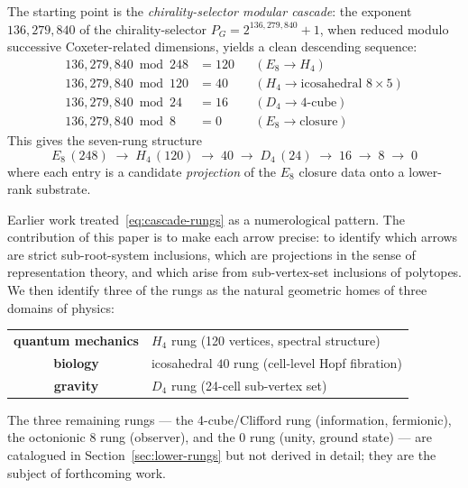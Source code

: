\documentclass[12pt]{article}
\begin{document}
The starting point is the \emph{chirality-selector modular cascade}: the exponent $136{,}279{,}840$ of the chirality-selector $P_G = 2^{136{,}279{,}840}+1$, when reduced modulo successive Coxeter-related dimensions, yields a clean descending sequence:
\begin{equation}\label{eq:cascade-residues}
\begin{aligned}
136{,}279{,}840 \bmod 248 &= 120 && (E_8 \to H_4) \\
136{,}279{,}840 \bmod 120 &= 40  && (H_4 \to \text{icosahedral 8}\times 5) \\
136{,}279{,}840 \bmod 24  &= 16  && (D_4 \to \text{4-cube}) \\
136{,}279{,}840 \bmod 8   &= 0   && (E_8 \to \text{closure})
\end{aligned}
\end{equation}
This gives the seven-rung structure
\begin{equation}\label{eq:cascade-rungs}
E_8 \,(248) \;\to\; H_4 \,(120) \;\to\; 40 \;\to\; D_4 \,(24) \;\to\; 16 \;\to\; 8 \;\to\; 0
\end{equation}
where each entry is a candidate \emph{projection} of the $E_8$ closure data onto a lower-rank substrate.

Earlier work treated~\eqref{eq:cascade-rungs} as a numerological pattern. The contribution of this paper is to make each arrow precise: to identify which arrows are strict sub-root-system inclusions, which are projections in the sense of representation theory, and which arise from sub-vertex-set inclusions of polytopes. We then identify three of the rungs as the natural geometric homes of three domains of physics:

\begin{center}
\begin{tabular}{c@{\quad=\quad}l}
\textbf{quantum mechanics} & $H_4$ rung (120 vertices, spectral structure) \\
\textbf{biology}           & icosahedral $40$ rung (cell-level Hopf fibration) \\
\textbf{gravity}           & $D_4$ rung (24-cell sub-vertex set)
\end{tabular}
\end{center}

\noindent The three remaining rungs --- the 4-cube/Clifford rung (information, fermionic), the octonionic 8 rung (observer), and the 0 rung (unity, ground state) --- are catalogued in Section~\ref{sec:lower-rungs} but not derived in detail; they are the subject of forthcoming work.
\end{document}
